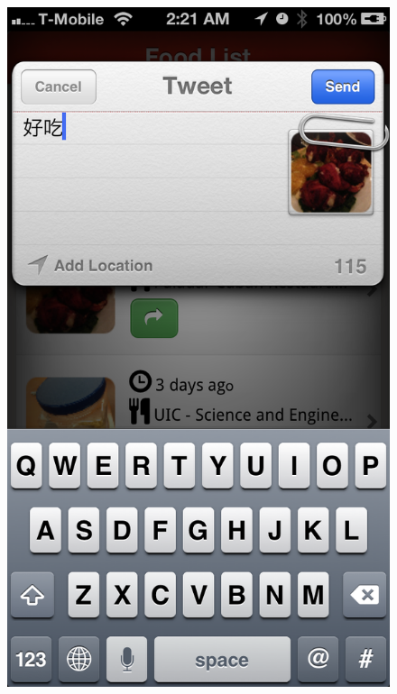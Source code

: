 \begin{figure}
{	\includegraphics[width=\figwidth, totalheight=\figheight, keepaspectratio]{./screenshots/foodlist-twitter.png}} \hfill
\end{figure}
